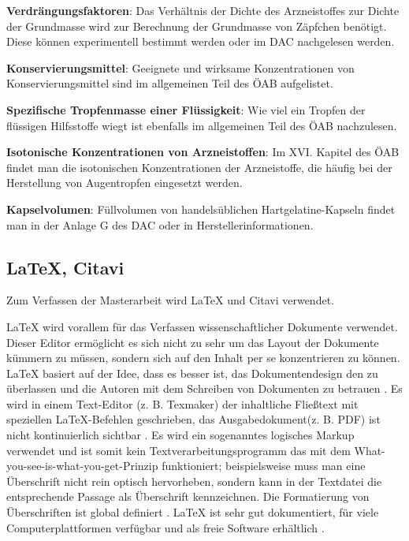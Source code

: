 \documentclass[12pt,a4paper]{article}
\begin{document}

\textbf{Verdrängungsfaktoren}: Das Verhältnis der Dichte des Arzneistoffes zur Dichte der Grundmasse wird zur Berechnung der Grundmasse von Zäpfchen benötigt. Diese können experimentell bestimmt werden oder im \ac{DAC} nachgelesen werden. 

\textbf{Konservierungsmittel}: Geeignete und wirksame Konzentrationen von Konservierungsmittel sind im allgemeinen Teil des \ac{ÖAB} aufgelistet. 

\textbf{Spezifische Tropfenmasse einer Flüssigkeit}: Wie viel ein Tropfen der flüssigen Hilfsstoffe wiegt ist ebenfalls im allgemeinen Teil des \ac{ÖAB} nachzulesen. 

\textbf{Isotonische Konzentrationen von Arzneistoffen}: Im XVI. Kapitel des \ac{ÖAB} findet man die isotonischen Konzentrationen der Arzneistoffe, die häufig bei der Herstellung von Augentropfen eingesetzt werden. 

\textbf{Kapselvolumen}: Füllvolumen von handelsüblichen Hartgelatine-Kapseln findet man in der Anlage G des \ac{DAC} oder in Herstellerinformationen. 






\subsection{LaTeX, Citavi}

Zum Verfassen der Masterarbeit wird LaTeX und Citavi verwendet. 

LaTeX wird vorallem für das Verfassen wissenschaftlicher Dokumente verwendet. Dieser Editor ermöglicht es  sich nicht zu sehr um das Layout der Dokumente kümmern zu müssen, sondern sich auf den Inhalt per se konzentrieren zu können. 
LaTeX basiert auf der Idee, dass es besser ist, das Dokumentendesign den  zu überlassen und die Autoren mit dem Schreiben von Dokumenten zu betrauen \cite{.09.03.2022}.
Es wird in einem Text-Editor (z. B. Texmaker) der inhaltliche Fließtext mit speziellen LaTeX-Befehlen geschrieben, das Ausgabedokument(z. B. PDF) ist nicht kontinuierlich sichtbar \cite{.25.03.2022}.
Es wird ein sogenanntes logisches Markup verwendet und ist somit kein Textverarbeitungsprogramm das mit dem What-you-see-is-what-you-get-Prinzip funktioniert; beispielsweise muss man eine Überschrift nicht rein optisch hervorheben, sondern kann in der Textdatei die entsprechende Passage als Überschrift kennzeichnen. 
Die Formatierung von Überschriften ist global definiert \cite{Wikipedia.2022}.
LaTeX ist sehr gut dokumentiert, für viele Computerplattformen verfügbar und als freie Software erhältlich \cite{.25.03.2022}.
\end{document}

